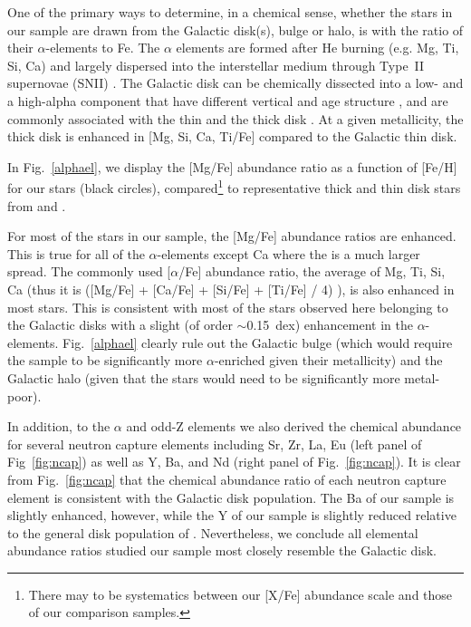 \documentclass[modern]{aastex62}
\begin{document}
One of the primary ways to determine, in a chemical sense, whether the stars in our sample are drawn from the Galactic disk(s), bulge or halo, is with the ratio of their $\alpha$-elements to Fe. The $\alpha$ elements are formed after He burning (e.g. Mg, Ti, Si, Ca) and largely dispersed into the interstellar medium through Type~II supernovae (SNII) \citep{Matteucci2001}. %
The Galactic disk can be chemically dissected into a low- and a high-alpha component that have different vertical and age structure \citep[see e.g.][]{2016ApJ...823...30B,2017A&A...608L...1H,2018MNRAS.475.5487S}, and are commonly associated with the thin and the thick disk \citep[e.g.][and references therein]{Edvardsson1993, Adibekyan2012, Feltzing2013, Bensby2014}. At a given metallicity, the thick disk is enhanced in [Mg, Si, Ca, Ti/Fe] compared to the Galactic thin disk.

In Fig.~\ref{alphael}, we display the [Mg/Fe] abundance ratio as a function of [Fe/H] for our stars (black circles), compared\footnote{There may to be systematics between our [X/Fe] abundance scale and those of our comparison samples.} to representative thick and thin disk stars from \cite[open red squares]{Bensby2014} and \cite[open blue triangles]{Adibekyan2012}. 

For most of the stars in our sample, the [Mg/Fe] abundance ratios are enhanced. This is true for all of the $\alpha$-elements except Ca where the is a much larger spread. The commonly used [$\alpha$/Fe] abundance ratio, the average of Mg, Ti, Si, Ca (thus it is ([Mg/Fe] + [Ca/Fe] + [Si/Fe] + [Ti/Fe] / 4) ), is also enhanced in most stars. This is consistent with most of the stars observed here belonging to the Galactic disks with a slight (of order $\sim$0.15~dex) enhancement in the $\alpha$-elements. Fig.~\ref{alphael} clearly rule out the Galactic bulge (which would require the sample to be significantly more $\alpha$-enriched given their metallicity) and the Galactic halo (given that the stars would need to be significantly more metal-poor). %

In addition, to the $\alpha$ and odd-Z elements we also derived the chemical abundance for several neutron capture elements including Sr, Zr, La, Eu (left panel of Fig~\ref{fig:ncap}) as well as Y, Ba, and Nd (right panel of Fig.~\ref{fig:ncap}).  It is clear from Fig.~\ref{fig:ncap}  that the chemical abundance ratio of each neutron capture element is consistent with the Galactic disk population. The Ba of our sample is slightly enhanced, however, while the Y of our sample is slightly reduced relative to the general disk population of \cite{Bensby2014}. Nevertheless, we conclude all elemental abundance ratios studied our sample most closely resemble the Galactic disk. 
\end{document}
